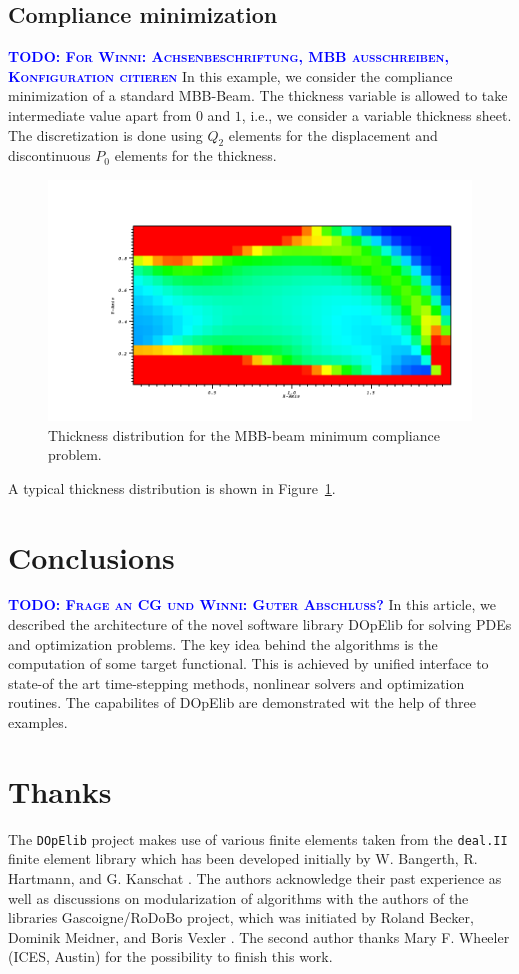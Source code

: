 \documentclass[smallextended]{svjour3}       %
\numberwithin{equation}{section}
\newcommand{\deal}{\texttt{deal.II}}
\newcommand{\dope}{\texttt{DOpElib}}
\newcommand{\todo}[1]{\textbf{\textsc{\textcolor{blue}{TODO: #1}}}}
\begin{document}
\subsection{Compliance minimization}
\todo{For Winni: Achsenbeschriftung, MBB ausschreiben, 
Konfiguration citieren}
In this example, we consider the compliance minimization of a standard MBB-Beam. 
The thickness variable is allowed to take intermediate value apart from $0$ and $1$,
i.e., we consider a variable thickness sheet. The discretization is done 
using $Q_2$ elements for the displacement and discontinuous $P_0$ elements for the 
thickness.
\begin{figure}
\centering
\includegraphics[width=1.\textwidth, viewport=150 0 1024 500, clip]{Pictures/MBB.png}
\caption{Thickness distribution for the MBB-beam minimum compliance problem.} 
\label{res:mbb}
\end{figure}
A typical thickness distribution is shown in Figure~\ref{res:mbb}.

\section{Conclusions}
\todo{Frage an CG und Winni: Guter Abschluss?}
In this article, we described the architecture 
of the novel software library DOpElib for solving 
PDEs and optimization problems. The key idea behind 
the algorithms is the computation of some target 
functional. This is achieved by unified interface 
to state-of the art time-stepping methods, nonlinear solvers and optimization
routines. The 
capabilites of DOpElib are demonstrated
wit the help of three examples.


\section*{Thanks}
The \dope{} project makes use of various finite elements taken from  
the \deal{} \cite{dealnew} finite element library which has been developed
 initially by W. Bangerth, R. Hartmann, and G. Kanschat \cite{dealold}.
The authors acknowledge their past experience as well as discussions 
on modularization of algorithms
with 
the authors of the libraries 
Gascoigne/RoDoBo project, which was initiated by 
Roland Becker, Dominik Meidner, and Boris Vexler \cite{rodobo}. 
The second author thanks Mary F. Wheeler (ICES, Austin) for the 
possibility to finish this work.

%


%
\end{document}
